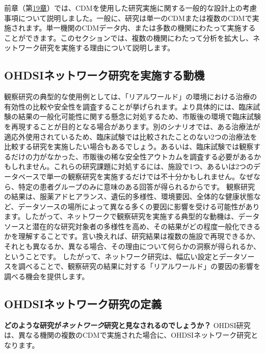 \documentclass[
  11pt]{book}
\makeatletter
\newenvironment{kframe}{%
\medskip{}
\setlength{\fboxsep}{.8em}
 \def\at@end@of@kframe{}%
 \ifinner\ifhmode%
  \def\at@end@of@kframe{\end{minipage}}%
  \begin{minipage}{\columnwidth}%
 \fi\fi%
 \def\FrameCommand##1{\hskip\@totalleftmargin \hskip-\fboxsep
 \colorbox{myShadeColor}{##1}\hskip-\fboxsep
     \hskip-\linewidth \hskip-\@totalleftmargin \hskip\columnwidth}%
 \MakeFramed {\advance\hsize-\width
   \@totalleftmargin\z@ \linewidth\hsize
   \@setminipage}}%
 {\par\unskip\endMakeFramed%
 \at@end@of@kframe}
\newenvironment{rmdblock}[1]
  {
  \begin{itemize}
  \renewcommand{\labelitemi}{
    \raisebox{-.7\height}[0pt][0pt]{
      {\setkeys{Gin}{width=3em,keepaspectratio}\texttt{[image: images/\#1]}}
    }
  }
  \setlength{\fboxsep}{1em}
  \begin{kframe}
  \item
  }
  {
  \end{kframe}
  \end{itemize}
  }
\newenvironment{rmdimportant}
  {\begin{rmdblock}{important}}
  {\end{rmdblock}}
\theoremstyle{definition}
\theoremstyle{definition}
\theoremstyle{definition}
\theoremstyle{definition}
\theoremstyle{remark}
\makeatother
\begin{document}

前章（第\href{https://ohdsi.github.io/TheBookOfOhdsi/StudySteps.html\#StudySteps}{19章}）では、CDMを使用した研究実施に関する一般的な設計上の考慮事項について説明しました。一般に、研究は単一のCDMまたは複数のCDMで実施されます。単一機関のCDMデータ内、または多数の機関にわたって実施することができます。このセクションでは、複数の機関にわたって分析を拡大し、ネットワーク研究を実施する理由について説明します。

\subsection{OHDSIネットワーク研究を実施する動機}\label{ohdsiux30cdux30c3ux30c8ux30efux30fcux30afux7814ux7a76ux3092ux5b9fux65bdux3059ux308bux52d5ux6a5f}

観察研究の典型的な使用例としては、「リアルワールド」の環境における治療の有効性の比較や安全性を調査することが挙げられます。より具体的には、臨床試験の結果の一般化可能性に関する懸念に対処するため、市販後の環境で臨床試験を再現することが目的となる場合があります。別のシナリオでは、ある治療法が適応外使用されているため、臨床試験では比較されたことのない2つの治療法を比較する研究を実施したい場合もあるでしょう。あるいは、臨床試験では観察するだけの力がなかった、市販後の稀な安全性アウトカムを調査する必要があるかもしれません。これらの研究課題に対処するには、施設で1つ、あるいは2つのデータベースで単一の観察研究を実施するだけでは不十分かもしれません。なぜなら、特定の患者グループのみに意味のある回答が得られるからです。 観察研究の結果は、服薬アドヒアランス、遺伝的多様性、環境要因、全体的な健康状態など、データソースの場所によって異なる多くの要因に影響を受ける可能性があります。したがって、ネットワークで観察研究を実施する典型的な動機は、データソースと潜在的な研究対象者の多様性を高め、その結果がどの程度一般化できるかを理解することです。言い換えれば、研究結果は複数の施設で再現できるか、それとも異なるか、異なる場合、その理由について何らかの洞察が得られるか、ということです。 したがって、ネットワーク研究は、幅広い設定とデータソースを調べることで、観察研究の結果に対する「リアルワールド」の要因の影響を調べる機会を提供します。

\subsection{OHDSIネットワーク研究の定義}\label{ohdsiux30cdux30c3ux30c8ux30efux30fcux30afux7814ux7a76ux306eux5b9aux7fa9}

\begin{rmdimportant}
\textbf{どのような研究が\emph{ネットワーク}研究と見なされるのでしょうか？} OHDSI研究は、異なる機関の複数のCDMで実施された場合に、OHDSIネットワーク研究となります。
\end{rmdimportant}
\end{document}
